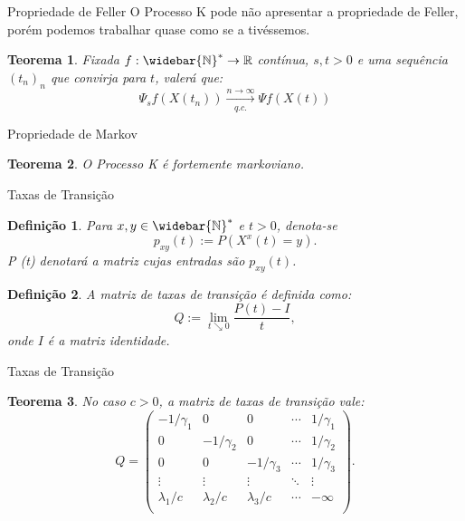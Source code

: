 \documentclass[xcolor=pdftex,dvipsnames]{beamer}
\newcommand{\Nzb}{{\mathbb{\widebar{N}^*}}}
\newcommand{\R}{{\mathbb{R}}}
\newtheorem{teorema}{Teorema}
\newtheorem{definicao}{Definição}
\begin{document}
\begin{frame}{Propriedade de Feller}
  O Processo K pode não apresentar a propriedade de Feller, porém
  podemos trabalhar quase como se a tivéssemos.
  \begin{teorema}
    Fixada $f: \Nzb \to \R$ contínua, $s, t > 0$ e uma sequência
    $(t_n)_n$ que convirja para $t$, valerá que:
    \begin{displaymath}
      \Psi_s f (X(t_n)) \xrightarrow[q.c.]{n \to \infty} \Psi f (X(t))
    \end{displaymath}
  \end{teorema}
\end{frame}

\begin{frame}{Propriedade de Markov}
  \begin{teorema}
    O Processo K é fortemente markoviano.
  \end{teorema}
\end{frame}


\begin{frame}{Taxas de Transição}
  \begin{definicao}
    Para $x, y \in \Nzb$ e $t > 0$, denota-se
    \begin{displaymath}
      p_{x y} (t) := P \left( X^x(t) = y \right).
    \end{displaymath}
    P (t) denotará a matriz cujas entradas são $p_{x y} (t)$.
  \end{definicao} \pause
  \begin{definicao}
    A matriz de taxas de transição é definida como:
    \begin{displaymath}
      Q := \lim_{t \searrow 0} \frac{P(t) - I}{t},
    \end{displaymath}
    onde $I$ é a matriz identidade.
  \end{definicao}
\end{frame}

\begin{frame}{Taxas de Transição}
  \begin{teorema}
    No caso $c > 0$, a matriz de taxas de transição vale:
    \begin{displaymath}
      Q = \left(
        \begin{array}{ccccc}
          -1/\gamma_1 & 0 & 0 & \cdots & 1/\gamma_1\\
          0 & -1/\gamma_2 & 0 & \cdots & 1/\gamma_2\\
          0 & 0 & -1/\gamma_3 & \cdots & 1/\gamma_3\\
          \vdots & \vdots & \vdots & \ddots & \vdots \\
          \lambda_1/c & \lambda_2/c &
          \lambda_3/c & \cdots & -\infty\\
        \end{array}
      \right).
    \end{displaymath}
  \end{teorema}
\end{frame}
\end{document}
